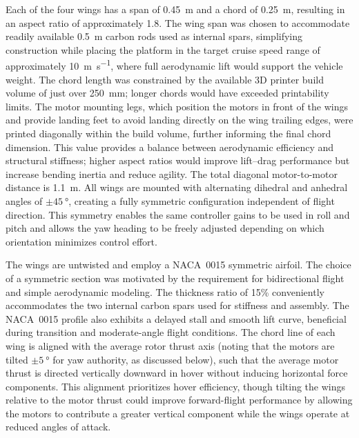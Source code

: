 Each of the four wings has a span of \SI{0.45}{\meter} and a chord of \SI{0.25}{\meter}, resulting in an aspect ratio of approximately 1.8.  
The wing span was chosen to accommodate readily available \SI{0.5}{\meter} carbon rods used as internal spars, simplifying construction while placing the platform in the target cruise speed range of approximately \SI{10}{\meter\per\second}, where full aerodynamic lift would support the vehicle weight.  
The chord length was constrained by the available 3D printer build volume of just over \SI{250}{\milli\meter}; longer chords would have exceeded printability limits.  
The motor mounting legs, which position the motors in front of the wings and provide landing feet to avoid landing directly on the wing trailing edges, were printed diagonally within the build volume, further informing the final chord dimension.  
This value provides a balance between aerodynamic efficiency and structural stiffness; higher aspect ratios would improve lift–drag performance but increase bending inertia and reduce agility.  
The total diagonal motor-to-motor distance is \SI{1.1}{\meter}.  
All wings are mounted with alternating dihedral and anhedral angles of \(\pm \SI{45}{\degree}\), creating a fully symmetric configuration independent of flight direction.  
This symmetry enables the same controller gains to be used in roll and pitch and allows the yaw heading to be freely adjusted depending on which orientation minimizes control effort.

The wings are untwisted and employ a NACA~0015 symmetric airfoil.  
The choice of a symmetric section was motivated by the requirement for bidirectional flight and simple aerodynamic modeling.  
The thickness ratio of 15\% conveniently accommodates the two internal carbon spars used for stiffness and assembly.  
The NACA~0015 profile also exhibits a delayed stall and smooth lift curve, beneficial during transition and moderate-angle flight conditions.  
The chord line of each wing is aligned with the average rotor thrust axis (noting that the motors are tilted \(\pm\SI{5}{\degree}\) for yaw authority, as discussed below), such that the average motor thrust is directed vertically downward in hover without inducing horizontal force components.  
This alignment prioritizes hover efficiency, though tilting the wings relative to the motor thrust could improve forward-flight performance by allowing the motors to contribute a greater vertical component while the wings operate at reduced angles of attack.

